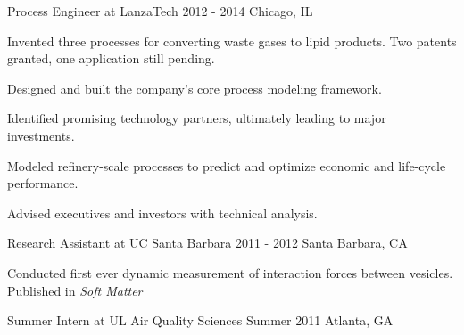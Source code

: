 \begin{cventries}
  \cventrynew
    {Process Engineer at LanzaTech} 
    {2012 - 2014} 
    {Chicago, IL} 
    {
      \begin{cvitems} 
        \item {Invented three processes for converting waste gases to lipid products. Two patents granted, one application still pending.}
		\item {Designed and built the company's core process modeling framework.}        
		\item {Identified promising technology partners, ultimately leading to major investments.}
        \item {Modeled refinery-scale processes to predict and optimize economic and life-cycle performance.}        
        \item {Advised executives and investors with technical analysis.}
      \end{cvitems}
    }
    
  \cventryshort
    {Research Assistant at UC Santa Barbara}
    {2011 - 2012}
    {Santa Barbara, CA}         
    {
      \begin{cvitems} %
        \item {Conducted first ever dynamic measurement of interaction forces between vesicles. Published in \emph{Soft Matter}}        
      \end{cvitems}
    }   
  
   \cventryshort
	{Summer Intern at UL Air Quality Sciences}    
    {Summer 2011}
    {Atlanta, GA}
    {}



\end{cventries}
